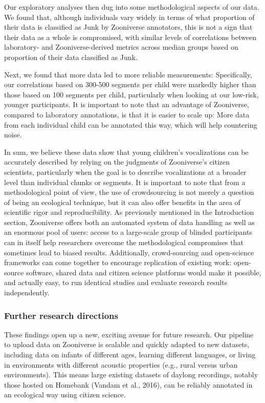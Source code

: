 \documentclass[english,,man]{apa6}
\begin{document}
Our exploratory analyses then dug into some methodological aspects of our data. We found that, although individuals vary widely in terms of what proportion of their data is classified as Junk by Zooniverse annotators, this is not a sign that their data as a whole is compromised, with similar levels of correlations between laboratory- and Zooniverse-derived metrics across median groups based on proportion of their data classified as Junk.

Next, we found that more data led to more reliable measurements: Specifically, our correlations based on 300-500 segments per child were markedly higher than those based on 100 segments per child, particularly when looking at our low-risk, younger participants. It is important to note that an advantage of Zooniverse, compared to laboratory annotations, is that it is easier to scale up: More data from each individual child can be annotated this way, which will help countering noise.

In sum, we believe these data show that young children's vocalizations can be accurately described by relying on the judgments of Zooniverse's citizen scientists, particularly when the goal is to describe vocalizations at a broader level than individual chunks or segments. It is important to note that from a methodological point of view, the use of crowdsourcing is not merely a question of being an ecological technique, but it can also offer benefits in the area of scientific rigor and reproducibility. As previously mentioned in the Introduction section, Zooniverse offers both an automated system of data handling as well as an enormous pool of users: access to a large-scale group of blinded participants can in itself help researchers overcome the methodological compromises that sometimes lead to biased results. Additionally, crowd-sourcing and open-science frameworks can come together to encourage replication of existing work: open-source software, shared data and citizen science platforms would make it possible, and actually easy, to run identical studies and evaluate research results independently.

\hypertarget{further-research-directions}{%
\subsubsection{Further research directions}\label{further-research-directions}}

These findings open up a new, exciting avenue for future research. Our pipeline to upload data on Zooniverse is scalable and quickly adapted to new datasets, including data on infants of different ages, learning different languages, or living in environments with different acoustic properties (e.g., rural versus urban environments). This means large existing datasets of daylong recordings, notably those hosted on Homebank (Vandam et al., 2016), can be reliably annotated in an ecological way using citizen science.
\end{document}
